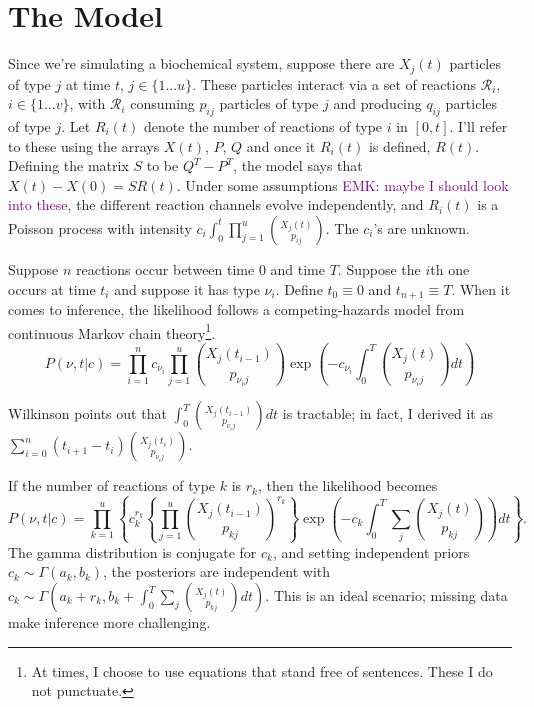 \documentclass{article}
\newcommand\EMK[1]{\textcolor{purple}{EMK: #1}}
\begin{document}
\section{The Model}
Since we're simulating a biochemical system, suppose there are $X_{j}(t)$ particles of type $j$ at time $t$, $j\in \{1 ... u\}$. These particles interact via a set of reactions $\mathcal{R}_{i}$, $i\in \{1 ... v\}$, with $\mathcal{R}_{i}$ consuming $p_{ij}$ particles of type $j$ and producing $q_{ij}$ particles of type $j$. Let $R_{i}(t)$ denote the number of reactions of type $i$ in $[0,t]$. I'll refer to these using the arrays $X(t)$, $P$, $Q$ and once it $R_{i}(t)$ is defined, $R(t)$. Defining the matrix $S$ to be $Q^T-P^T$, the model says that $X(t) - X(0) = SR(t)$. Under some assumptions \EMK{maybe I should look into these}, the different reaction channels evolve independently, and $R_{i}(t)$ is a Poisson process with intensity $c_{i}\int_0^t \prod_{j=1}^u {{X_j(t)}\choose{p_{ij}}}$. %
The $c_{i}$'s are unknown.

Suppose $n$ reactions occur between time $0$ and time $T$. Suppose the $i$th one occurs at time $t_{i}$ and suppose it has type $\nu_{i}$. Define $t_0\equiv0$ and $t_{n+1}\equiv T$. When it comes to inference, the likelihood follows a competing-hazards model from continuous Markov chain theory\footnote{At times, I choose to use equations that stand free of sentences. These I do not punctuate.}. 
$$P(\nu, t|c) = \prod_{i=1}^n c_{\nu_{i}} \prod_{j=1}^u {{X_{j}(t_{i-1})}\choose{p_{{\nu_{i}}j}}}\exp\left(-c_{\nu_{i}}\int_0^T {{X_j(t)}\choose{p_{{\nu_{i}}j}}} dt\right)$$

Wilkinson points out that $\int_0^T {{X_j(t_{i-1})}\choose{p_{{\nu_{i}}j}}}dt$ is tractable; in fact, I derived it as $\sum_{i=0}^{n} (t_{i+1}-t_{i}) {{X_j(t_{i})}\choose{p_{{\nu_{i}}j}}}$. 

If the number of reactions of type $k$ is $r_k$, then the likelihood becomes 
$$P(\nu, t|c) = \prod_{k=1}^u \left\{ c_{k}^{r_k} 
\left\{\prod_{j=1}^u { X_{j}(t_{i-1})\choose p_{kj}}^{r_k}\right\}\exp\left(-c_{k}\int_0^T \sum_j{X_j(t)\choose p_{kj}} \right)dt\right\}.$$  
The gamma distribution is conjugate for $c_k$, and setting independent priors $c_k\sim \Gamma(a_k, b_k)$, the posteriors are independent with $c_k\sim \Gamma(a_k+r_k, b_k+\int_0^T \sum_j {X_j(t) \choose p_{kj}}dt )$. This is an ideal scenario; missing data make inference more challenging.
\end{document}

